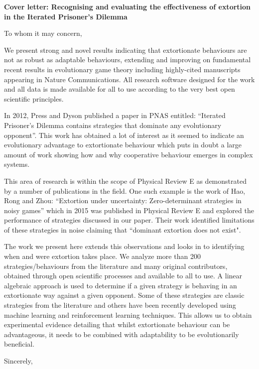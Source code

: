 \documentclass[11pt]{letter}
\begin{document}
\signature{The authors}

\begin{letter}{}

\textbf{Cover letter: Recognising and evaluating the effectiveness
       of extortion in the Iterated Prisoner's Dilemma}

To whom it may concern,

We present strong and novel results indicating that extortionate behaviours are
not as robust as adaptable behaviours, extending and improving on fundamental
recent results in evolutionary game theory including highly-cited manuscripts
appearing in Nature Communications. All research software designed for the work
and all data is made available for all to use according to the very best open
scientific principles.

In 2012, Press and Dyson published a paper in PNAS entitled: ``Iterated
Prisoner’s Dilemma contains strategies that dominate any evolutionary
opponent''. This work has obtained a lot of interest as it seemed to indicate an
evolutionary advantage to extortionate behaviour which puts in doubt a
large amount of work showing how and why cooperative behaviour emerges in
complex systems.

This area of research is within the scope of Physical Review E as
demonstrated by a number of publications in the field. One such example is the work
of Hao, Rong and Zhou: ``Extortion under uncertainty: Zero-determinant
strategies in noisy games'' which in 2015 was published in
Physical Review E and explored the performance of strategies discussed in our
paper. Their work identified limitations of these strategies in noise claiming
that ``dominant extortion does not exist".

The work we present here extends this observations and looks in to identifying
when and were extortion takes place.
We analyze more than 200 strategies/behaviours from the literature and
many original contributors, obtained through open scientific processes and
available to all to use. A linear algebraic approach is used to determine if a
given strategy is behaving in an extortionate way against a given opponent. Some
of these strategies are classic strategies from the literature and others have
been recently developed using machine learning and reinforcement learning
techniques. This allows us to obtain experimental evidence detailing that whilst
extortionate behaviour can be advantageous, it needs to be combined with
adaptability to be evolutionarily beneficial.

\closing{Sincerely,}

\end{letter}
\end{document}

